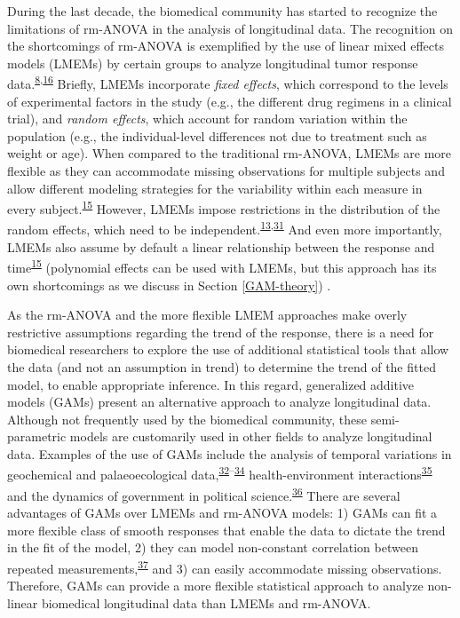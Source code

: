 \documentclass[
]{article}
\begin{document}
During the last decade, the biomedical community has started to recognize the limitations of rm-ANOVA in the analysis of longitudinal data. The recognition on the shortcomings of rm-ANOVA is exemplified by the use of linear mixed effects models (LMEMs) by certain groups to analyze longitudinal tumor response data.\textsuperscript{\protect\hyperlink{ref-skala2010}{8},\protect\hyperlink{ref-vishwanath2009}{16}} Briefly, LMEMs incorporate \emph{fixed effects}, which correspond to the levels of experimental factors in the study (e.g., the different drug regimens in a clinical trial), and \emph{random effects}, which account for random variation within the population (e.g., the individual-level differences not due to treatment such as weight or age). When compared to the traditional rm-ANOVA, LMEMs are more flexible as they can accommodate missing observations for multiple subjects and allow different modeling strategies for the variability within each measure in every subject.\textsuperscript{\protect\hyperlink{ref-pinheiro2006}{15}} However, LMEMs impose restrictions in the distribution of the random effects, which need to be independent.\textsuperscript{\protect\hyperlink{ref-gueorguieva2004}{13},\protect\hyperlink{ref-barr2013}{31}} And even more importantly, LMEMs also assume by default a linear relationship between the response and time\textsuperscript{\protect\hyperlink{ref-pinheiro2006}{15}} (polynomial effects can be used with LMEMs, but this approach has its own shortcomings as we discuss in Section \ref{GAM-theory}) .

As the rm-ANOVA and the more flexible LMEM approaches make overly restrictive assumptions regarding the trend of the response, there is a need for biomedical researchers to explore the use of additional statistical tools that allow the data (and not an assumption in trend) to determine the trend of the fitted model, to enable appropriate inference. In this regard, generalized additive models (GAMs) present an alternative approach to analyze longitudinal data. Although not frequently used by the biomedical community, these semi-parametric models are customarily used in other fields to analyze longitudinal data. Examples of the use of GAMs include the analysis of temporal variations in geochemical and palaeoecological data,\textsuperscript{\protect\hyperlink{ref-rose2012}{32}--\protect\hyperlink{ref-simpson2018}{34}} health-environment interactions\textsuperscript{\protect\hyperlink{ref-yang2012}{35}} and the dynamics of government in political science.\textsuperscript{\protect\hyperlink{ref-beck1998}{36}} There are several advantages of GAMs over LMEMs and rm-ANOVA models: 1) GAMs can fit a more flexible class of smooth responses that enable the data to dictate the trend in the fit of the model, 2) they can model non-constant correlation between repeated measurements,\textsuperscript{\protect\hyperlink{ref-wood2017}{37}} and 3) can easily accommodate missing observations. Therefore, GAMs can provide a more flexible statistical approach to analyze non-linear biomedical longitudinal data than LMEMs and rm-ANOVA.
\end{document}

